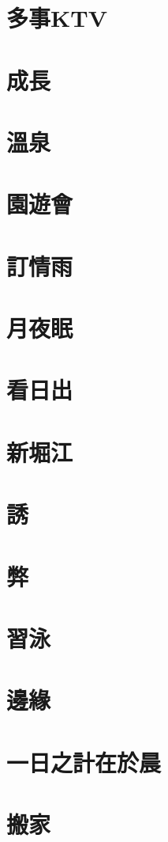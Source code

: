 \documentclass[hyperref]{ctexbook}
\begin{document}
\chapter{多事KTV}
\chapter{成長}
\chapter{溫泉}
\chapter{園遊會}
\chapter{訂情雨}
\chapter{月夜眠}
\chapter{看日出}
\chapter{新堀江}
\chapter{誘}
\chapter{弊}
\chapter{習泳}
\chapter{邊緣}
\chapter{一日之計在於晨}
\chapter{搬家}
\end{document}
